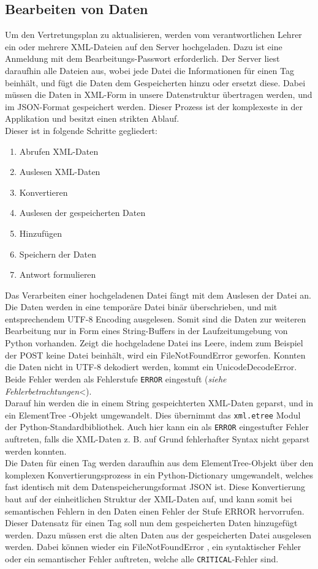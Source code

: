 \subsection{Bearbeiten von Daten}
Um den Vertretungsplan zu aktualisieren, werden vom verantwortlichen Lehrer ein oder mehrere
XML-Dateien auf den Server hochgeladen. Dazu ist eine Anmeldung mit dem Bearbeitungs-Passwort
erforderlich. Der Server liest daraufhin alle Dateien aus, wobei jede Datei die Informationen
für einen Tag beinhält, und fügt die Daten dem Gespeicherten hinzu oder ersetzt diese. Dabei
müssen die Daten in XML-Form in unsere Datenstruktur übertragen werden, und im JSON-Format
gespeichert werden. Dieser Prozess ist der komplexeste in der Applikation und besitzt einen
strikten Ablauf.\\
Dieser ist in folgende Schritte gegliedert:
\begin{enumerate}
	\item Abrufen XML-Daten
	\item Auslesen XML-Daten
	\item Konvertieren
	\item Auslesen der gespeicherten Daten
	\item Hinzufügen
	\item Speichern der Daten
	\item Antwort formulieren
\end{enumerate}
Das Verarbeiten einer hochgeladenen Datei fängt mit dem Auslesen der Datei an. Die Daten werden
in eine temporäre Datei binär überschrieben, und mit entsprechendem UTF-8 Encoding ausgelesen.
Somit sind die Daten zur weiteren Bearbeitung nur in Form eines String-Buffers in der Laufzeitumgebung
von Python vorhanden. Zeigt die hochgeladene Datei ins Leere, indem zum Beispiel der POST keine
Datei beinhält, wird ein FileNotFoundError geworfen. Konnten die Daten nicht in UTF-8
dekodiert werden, kommt ein UnicodeDecodeError. Beide Fehler werden als Fehlerstufe 
\texttt{ERROR} eingestuft (\textit{siehe Fehlerbetrachtungen}<).
\\Darauf hin werden die in einem String gespeichterten XML-Daten geparst, und in ein ElementTree
-Objekt umgewandelt. Dies übernimmt das \texttt{xml.etree} Modul der Python-Standardbibliothek.
Auch hier kann ein als \texttt{ERROR} eingestufter Fehler auftreten, falls die XML-Daten z. B. auf
Grund fehlerhafter Syntax nicht geparst werden konnten.\\
Die Daten für einen Tag werden daraufhin aus dem ElementTree-Objekt über den komplexen Konvertierungsprozess
in ein Python-Dictionary umgewandelt, welches fast identisch mit dem Datenspeicherungsformat JSON ist.
Diese Konvertierung baut auf der einheitlichen Struktur der XML-Daten auf, und kann somit bei semantischen
Fehlern in den Daten einen Fehler der Stufe ERROR hervorrufen.\\
Dieser Datensatz für einen Tag soll nun dem gespeicherten Daten hinzugefügt werden. Dazu müssen erst
die alten Daten aus der gespeicherten Datei ausgelesen werden. Dabei können wieder ein FileNotFoundError
, ein syntaktischer Fehler oder ein semantischer Fehler auftreten, welche alle \texttt{CRITICAL}-Fehler sind.

